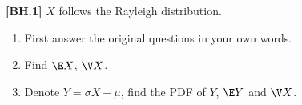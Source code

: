 \begin{exercise}
	\textbf{[BH.1]}
$X$ follows the Rayleigh distribution.
	\begin{enumerate}
		\item First answer the original questions in your own words.
		\item Find $\E X$, $\V X$.
		\item Denote $Y=\sigma X+\mu$, find the PDF of $Y$, $\E Y$ and $\V X$.
	\end{enumerate}   
\end{exercise}
